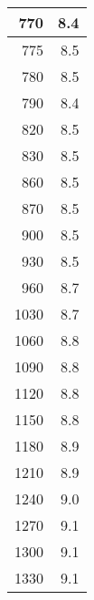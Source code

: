 \documentclass[10pt,twocolumn]{article}
\begin{document}
\begin{table}[H]
\begin{minipage}{.45\textwidth}
\begin{tabular}{|r|r|}
770 & 8.4 \\ \hline
775 & 8.5 \\ \hline
780 & 8.5 \\ \hline
790 & 8.4 \\ \hline
820 & 8.5 \\ \hline
830 & 8.5 \\ \hline
860 & 8.5 \\ \hline
870 & 8.5 \\ \hline
900 & 8.5 \\ \hline
930 & 8.5 \\ \hline
960 & 8.7 \\ \hline
1030 & 8.7 \\ \hline
1060 & 8.8 \\ \hline
1090 & 8.8 \\ \hline
1120 & 8.8 \\ \hline
1150 & 8.8 \\ \hline
1180 & 8.9 \\ \hline
1210 & 8.9 \\ \hline
1240 & 9.0 \\ \hline
1270 & 9.1 \\ \hline
1300 & 9.1 \\ \hline
1330 & 9.1 \\ \hline
\end{tabular}
\end{minipage}


\end{table}
\end{document}
